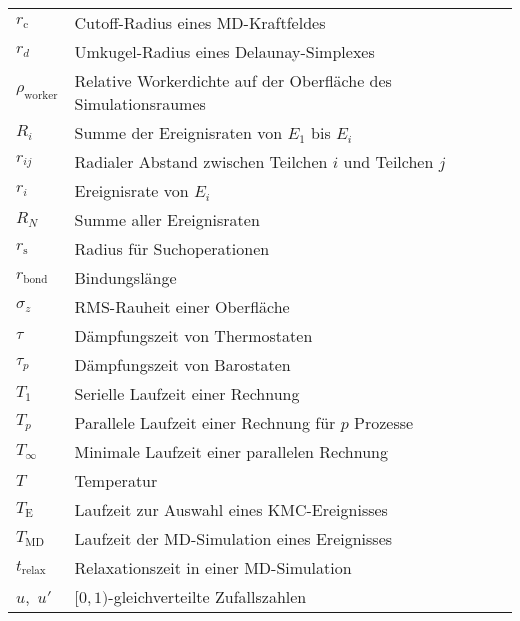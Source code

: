 {\begin{longtable}{ll}
$r_\text{c}$         & Cutoff-Radius eines MD-Kraftfeldes                                  \\
$r_d$                & Umkugel-Radius eines Delaunay-Simplexes                             \\
$\rho_\text{worker}$ & Relative Workerdichte auf der Oberfläche des Simulationsraumes      \\
$R_i$                & Summe der Ereignisraten von $E_1$ bis $E_i$                         \\
$r_{ij}$             & Radialer Abstand zwischen Teilchen $i$ und Teilchen $j$             \\
$r_i$                & Ereignisrate von $E_i$                                              \\
$R_N$                & Summe aller Ereignisraten                                           \\
$r_\text{s}$         & Radius für Suchoperationen                                          \\
$r_\text{bond}$      & Bindungslänge                                                       \\
$\sigma_z$           & RMS-Rauheit einer Oberfläche                                        \\
$\tau$               & Dämpfungszeit von Thermostaten                                      \\
$\tau_p$             & Dämpfungszeit von Barostaten                                        \\
$T_1$                & Serielle Laufzeit einer Rechnung                                    \\
$T_p$                & Parallele Laufzeit einer Rechnung für $p$ Prozesse                  \\
$T_\infty$           & Minimale Laufzeit einer parallelen Rechnung                         \\
$T$                  & Temperatur                                                          \\
$T_\text{E}$         & Laufzeit zur Auswahl eines KMC-Ereignisses                          \\
$T_\text{MD}$        & Laufzeit der MD-Simulation eines Ereignisses                        \\
$t_\text{relax}$     & Relaxationszeit in einer MD-Simulation                              \\
$u$,~$u'$            & $[0,1)$-gleichverteilte Zufallszahlen                               \\

\end{longtable}}
